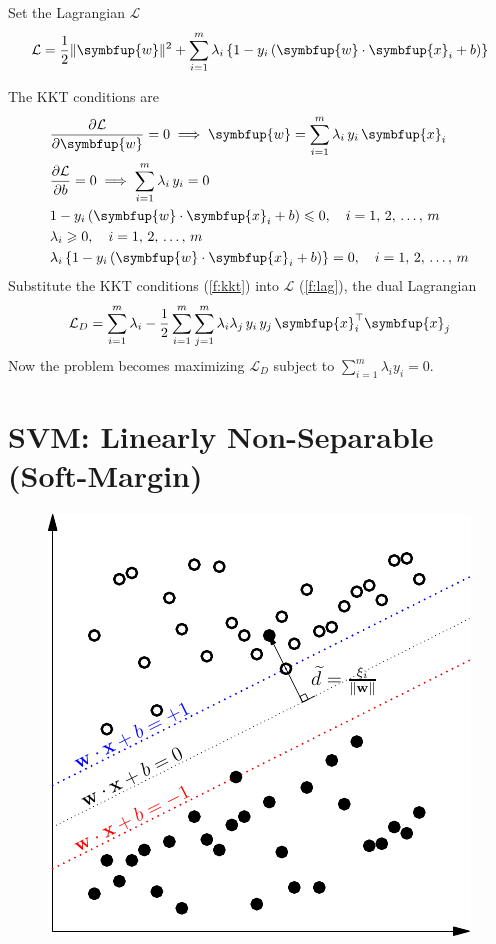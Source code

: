 \documentclass[11pt]{extarticle}
\newcommand{\ds}{\displaystyle}
\newcommand{\ie}{\;\Longrightarrow\;}
\newcommand{\vx}{\symbfup{x}}
\newcommand{\vw}{\symbfup{w}}
\theoremstyle{definition}
\begin{document}
\bigskip
\noindent Set the Lagrangian $\mathcal{L}$
\begin{align}\label{f:lag}
  \mathcal{L} = \frac{1}{2}\|\vw\|^2 + \sum_{i=1}^m\lambda_i\left\{1 - y_i\left(\vw\cdot\vx_i + b\right)\right\}
\end{align}

\newpage

\noindent The KKT conditions are
\begin{equation}
\begin{aligned}\label{f:kkt}
  &\frac{\partial\mathcal{L}}{\partial \vw} = 0 \ie \vw=\sum_{i=1}^m\lambda_i\,y_i\,\vx_i\\
  &\frac{\partial\mathcal{L}}{\partial b} = 0 \ie \sum_{i=1}^m\lambda_i\,y_i=0\\
  & 1- y_i\left(\vw\cdot\vx_i + b \right) \leqslant 0,\quad i=1,\,2,\,\ldots,\,m\\
  &\lambda_i\geqslant 0,\quad i=1,\,2,\,\ldots,\,m\\
  &\lambda_i\left\{1 - y_i\left(\vw\cdot\vx_i + b \right)\right\}=0,\quad i=1,\,2,\,\ldots,\,m
\end{aligned}
\end{equation}
Substitute the KKT conditions (\ref{f:kkt}) into $\mathcal{L}$ (\ref{f:lag}), the dual Lagrangian
\begin{align*}
  \mathcal{L}_D=\sum_{i=1}^m\lambda_i-\frac{1}{2}\sum_{i=1}^m\sum_{j=1}^m\lambda_i\lambda_j\,y_i\,y_j\,\vx_i^\top\vx_j
\end{align*}
Now the problem becomes maximizing $\mathcal{L}_D$ subject to $\ds\sum_{i=1}^m\lambda_i y_i = 0$.

\newpage

\section*{SVM: Linearly Non-Separable (Soft-Margin)}
\begin{figure}[!htbp]
  \centering
  \includegraphics[scale=0.8]{fig/d2.pdf}
  \label{fig:d2}
\end{figure}
\end{document}
